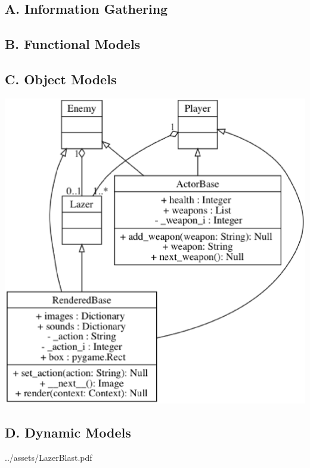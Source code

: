 %

\subsection*{A. Information Gathering}

\subsection*{B. Functional Models}

\subsection*{C. Object Models}
    \includegraphics{../assets/object_models}

\subsection*{D. Dynamic Models}


           {../assets/LazerBlast.pdf}
